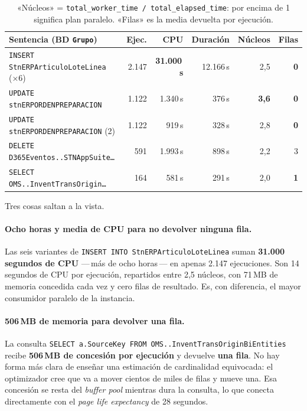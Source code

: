 \documentclass[11pt,a4paper]{article}
\newcommand{\cod}[1]{\texttt{\small #1}}
\newcommand{\critico}[1]{\textcolor{rojo}{\textbf{#1}}}
\begin{document}
\begin{table}[h]
\centering
\small
\begin{tabular}{lrrrrr}
\toprule
\textbf{Sentencia (BD \cod{Grupo})} & \textbf{Ejec.} & \textbf{CPU} &
\textbf{Duración} & \textbf{Núcleos} & \textbf{Filas} \\
\midrule
\cod{INSERT StnERPArticuloLoteLinea} (×6) & 2.147 & \critico{31.000\,s} &
  12.166\,s & 2,5 & \critico{0} \\
\cod{UPDATE stnERPORDENPREPARACION} & 1.122 & 1.340\,s & 376\,s &
  \critico{3,6} & \critico{0} \\
\cod{UPDATE stnERPORDENPREPARACION} (2) & 1.122 & 919\,s & 328\,s & 2,8 &
  \critico{0} \\
\cod{DELETE D365Eventos..STNAppSuite\ldots} & 591 & 1.993\,s & 898\,s & 2,2 & 3 \\
\cod{SELECT OMS..InventTransOrigin\ldots} & 164 & 581\,s & 291\,s & 2,0 &
  \critico{1} \\
\bottomrule
\end{tabular}
\caption{«Núcleos» = \cod{total\_worker\_time / total\_elapsed\_time}: por
encima de 1 significa plan paralelo. «Filas» es la media devuelta por
ejecución.}
\end{table}

Tres cosas saltan a la vista.

\paragraph{Ocho horas y media de CPU para no devolver ninguna fila.} Las seis
variantes de \cod{INSERT INTO StnERPArticuloLoteLinea} suman
\textbf{31.000 segundos de CPU} —\,más de ocho horas\,— en apenas 2.147
ejecuciones. Son 14 segundos de CPU por ejecución, repartidos entre 2,5
núcleos, con 71\,MB de memoria concedida cada vez y cero filas de resultado.
Es, con diferencia, el mayor consumidor paralelo de la instancia.

\paragraph{506\,MB de memoria para devolver una fila.} La consulta
\cod{SELECT a.SourceKey FROM OMS..InventTransOriginBiEntities} recibe
\textbf{506\,MB de concesión por ejecución} y devuelve \textbf{una fila}. No
hay forma más clara de enseñar una estimación de cardinalidad equivocada: el
optimizador cree que va a mover cientos de miles de filas y mueve una. Esa
concesión se resta del \emph{buffer pool} mientras dura la consulta, lo que
conecta directamente con el \emph{page life expectancy} de 28 segundos.
\end{document}
